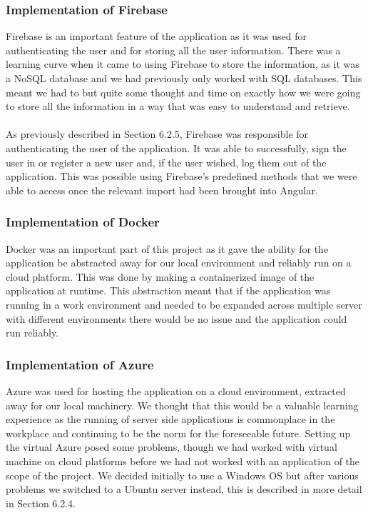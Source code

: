\subsubsection{Implementation of Firebase}
Firebase is an important feature of the application as it was used for authenticating the user and for storing all the user information.  There was a learning curve when it came to using Firebase to store the information, as it was a NoSQL database and we had previously only worked with SQL databases.  This meant we had to but quite some thought and time on exactly how we were going to store all the information in a way that was easy to understand and retrieve.\\\\
As previously described in Section 6.2.5, Firebase was responsible for authenticating the user of the application.  It was able to successfully, sign the user in or register a new user and, if the user wished, log them out of the application.  This was possible using Firebase's predefined methods that we were able to access once the relevant import had been brought into Angular.

\subsubsection{Implementation of Docker}
Docker was an important part of this project as it gave the ability for the application be abstracted away for our local environment and reliably run on a cloud platform.  This was done by making a containerized image of the application at runtime. This abstraction meant that if the application was running in a work environment and needed to be expanded across multiple server with different environments there would be no issue and the application could run reliably.

\subsubsection{Implementation of Azure}
Azure was used for hosting the application on a cloud environment, extracted away for our local machinery.  We thought that this would be a valuable learning experience as the running of server side applications is commonplace in the workplace and continuing to be the norm for the foreseeable future. Setting up the virtual Azure posed some problems, though we had worked with virtual machine on cloud platforms before we had not worked with an application of the scope of the project.  We decided initially to use a Windows OS but after various problems we switched to a Ubuntu server instead, this is described in more detail in Section 6.2.4.

